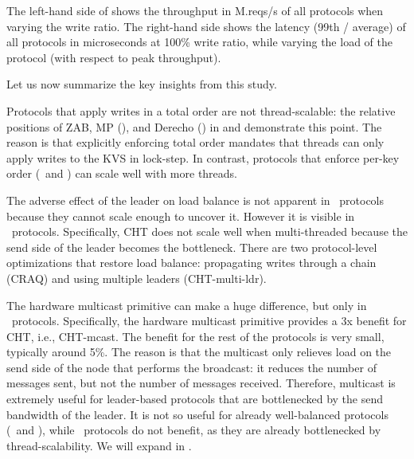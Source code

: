 The left-hand side of  shows the throughput in M.reqs/s of all protocols when varying the write ratio. 
The right-hand side shows the latency (99th / average) of all protocols in microseconds at 100\% write ratio, while varying the load of the protocol (\ie with respect to peak throughput). 

\custvspace
\noindent
Let us now summarize the key insights from this study.


Protocols that apply writes in a total order are not thread-scalable:
the relative positions of ZAB, MP (\LTO), and Derecho (\DTO) in  and  demonstrate this point. The reason is that explicitly enforcing total order mandates that threads can only apply writes to the KVS in lock-step.
In contrast, protocols that enforce per-key order (\LPKO~and \DPKO) can scale well with more threads.

The adverse effect of the leader on load balance is not apparent in \LTO~protocols because they cannot scale enough to uncover it.
However it is visible in \LPKO~protocols.
Specifically, CHT does not scale well when multi-threaded because the send side of the leader becomes the bottleneck. %
There are two protocol-level optimizations that restore load balance: propagating writes through a chain (\ie CRAQ) and using multiple leaders (\ie CHT-multi-ldr).

The hardware multicast primitive can make a huge difference, but only in \LPKO~protocols.
Specifically, the hardware multicast primitive provides a 3x benefit for CHT, i.e., CHT-mcast. 
The benefit for the rest of the protocols is very small, typically around 5\%.
The reason is that the multicast only relieves load on the send side of the node that performs the broadcast: it reduces the number of messages sent, but not the number of messages received.
Therefore, multicast is extremely useful for leader-based protocols that are bottlenecked by the send bandwidth of the leader. It is not so useful for already well-balanced protocols (\ie \DTO\  and \DPKO), while \LTO\ protocols do not benefit, as they are already bottlenecked by thread-scalability. We will expand in .%


